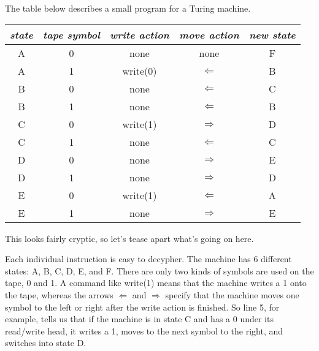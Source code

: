 \begin{examplebox}
    The table below describes a small program for a Turing machine.
    \begin{center}
        \begin{tabular}{cc|ccc}
            \emph{state} & \emph{tape symbol} & \emph{write action} & \emph{move action} & \emph{new state}\\
            \hline
            A            & 0                  & none                & none               & F\\
            A            & 1                  & write(0)            & $\Leftarrow$       & B\\
            B            & 0                  & none                & $\Leftarrow$       & C\\
            B            & 1                  & none                & $\Leftarrow$       & B\\
            C            & 0                  & write(1)            & $\Rightarrow$      & D\\
            C            & 1                  & none                & $\Leftarrow$       & C\\
            D            & 0                  & none                & $\Rightarrow$      & E\\
            D            & 1                  & none                & $\Rightarrow$      & D\\
            E            & 0                  & write(1)            & $\Leftarrow$       & A\\
            E            & 1                  & none                & $\Rightarrow$      & E\\
        \end{tabular}
    \end{center}
    This looks fairly cryptic, so let's tease apart what's going on here.

    Each individual instruction is easy to decypher.
    The machine has 6 different states: A, B, C, D, E, and F.
    There are only two kinds of symbols are used on the tape, 0 and 1.
    A command like write(1) means that the machine writes a 1 onto the tape, whereas the arrows $\Leftarrow$ and $\Rightarrow$ specify that the machine moves one symbol to the left or right after the write action is finished.
    So line 5, for example, tells us that if the machine is in state C and has a 0 under its read/write head, it writes a 1, moves to the next symbol to the right, and switches into state D.


\end{examplebox}
